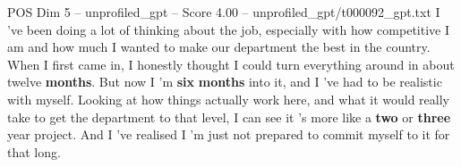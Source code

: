 \begin{textsample}{POS Dim 5 – unprofiled\_gpt – Score 4.00 – unprofiled\_gpt/t000092\_gpt.txt}  \label{ex:f5_pos_039}
I ’ve been doing a lot of thinking about the job, especially with how competitive I am and how much I wanted to make our department the best in the country.
When I first came in, I honestly thought I could turn everything around in about twelve \textbf{months}.
But now I ’m \textbf{six} \textbf{months} into it, and I ’ve had to be realistic with myself.
Looking at how things actually work here, and what it would really take to get the department to that level, I can see it ’s more like a \textbf{two} or \textbf{three} year project.
And I ’ve realised I ’m just not prepared to commit myself to it for that long.

\end{textsample}
